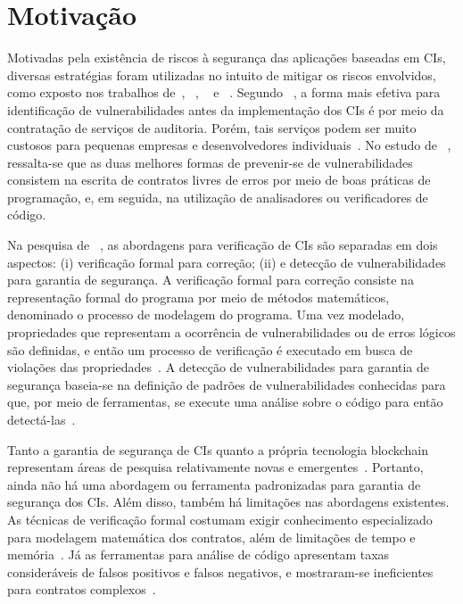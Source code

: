 \section{Motivação}

Motivadas pela existência de riscos à segurança das aplicações baseadas em CIs, diversas estratégias foram utilizadas no intuito de mitigar os riscos envolvidos, como exposto nos trabalhos de~, ~, ~ e ~. Segundo ~, a forma mais efetiva para identificação de vulnerabilidades antes da implementação dos CIs é por meio da contratação de serviços de auditoria. Porém, tais serviços podem ser muito custosos para pequenas empresas e desenvolvedores individuais~\cite{dika2018security}. No estudo de ~, ressalta-se que as duas melhores formas de prevenir-se de vulnerabilidades consistem na escrita de contratos livres de erros por meio de boas práticas de programação, e, em seguida, na utilização de analisadores ou verificadores de código.  

Na pesquisa de ~, as abordagens para verificação de CIs são separadas em dois aspectos: (i) verificação formal para correção; (ii) e detecção de vulnerabilidades para garantia de segurança. A verificação formal para correção consiste na representação formal do programa por meio de métodos matemáticos, denominado o processo de modelagem do programa. Uma vez modelado, propriedades que representam a ocorrência de vulnerabilidades ou de erros lógicos são definidas, e então um processo de verificação é executado em busca de violações das propriedades~\cite{almakhour2020verification-survey, singh2020survey-vulnerabilities-elsevier}. A detecção de vulnerabilidades para garantia de segurança baseia-se na definição de padrões de vulnerabilidades conhecidas para que, por meio de ferramentas, se execute uma análise sobre o código para então detectá-las~\cite{almakhour2020verification-survey}.

Tanto a garantia de segurança de CIs quanto a própria tecnologia blockchain representam áreas de pesquisa relativamente novas e emergentes~\cite{chen2020survey-ethereum-acm, kannengiesser2020trade-offs-acmcs}. Portanto, ainda não há uma abordagem ou ferramenta padronizadas para garantia de segurança dos CIs. Além disso, também há limitações nas abordagens existentes. As técnicas de verificação formal costumam exigir conhecimento especializado para modelagem matemática dos contratos, além de limitações de tempo e memória~\cite{chen2020survey-ethereum-acm}. Já as ferramentas para análise de código apresentam taxas consideráveis de falsos positivos e falsos negativos, e mostraram-se ineficientes para contratos complexos~\cite{kim2020automated-test-sc}. 

